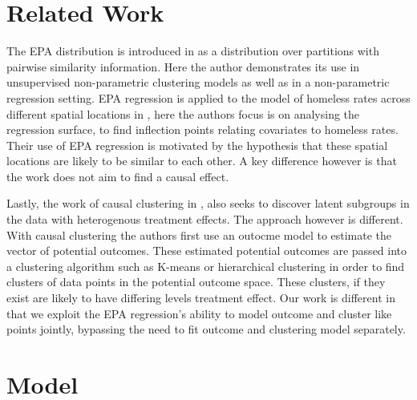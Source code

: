 \documentclass{article}
\begin{document}
\section{Related Work}

The EPA distribution is introduced in \cite{dahl2017random} as a distribution over partitions with pairwise similarity information. Here the author demonstrates its use in unsupervised non-parametric clustering models as well as in a non-parametric regression setting. EPA regression is applied to the model of homeless rates across different spatial locations in \cite{glynn2021inflection}, here the authors focus is on analysing the regression surface, to find inflection points relating covariates to homeless rates. Their use of EPA regression is motivated by the hypothesis that these spatial locations are likely to be similar to each other.  A key difference however is that the work does not aim to find a causal effect.

Lastly, the work of causal clustering in \cite{kim2020causal}, also seeks to discover latent subgroups in the data with heterogenous treatment effects. The approach however is different. With causal clustering the authors first use an outocme model to estimate the vector of potential outcomes. These estimated potential outcomes are passed into a clustering algorithm such as K-means or hierarchical clustering in order to find clusters of data points in the potential outcome space. These clusters, if they exist are likely to have differing levels treatment effect. Our work is different in that we exploit the EPA regression's ability to model outcome and cluster like points jointly, bypassing the need to fit outcome and clustering model separately. 

\section{Model}
\label{sec:Model}
\end{document}
